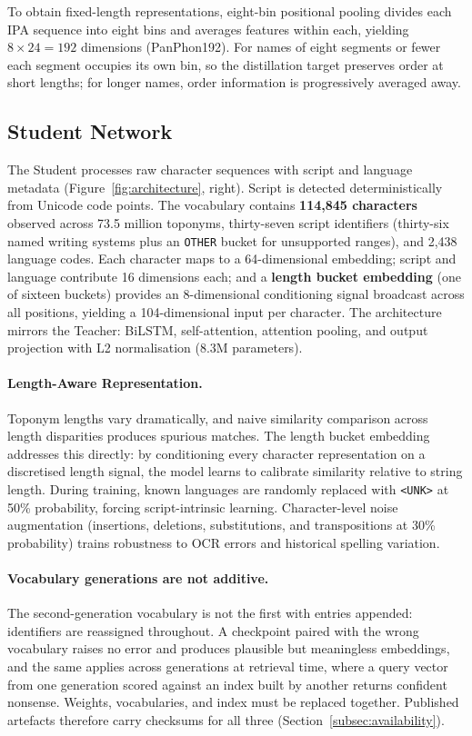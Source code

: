 \documentclass[11pt,a4paper]{article}
\begin{document}
To obtain fixed-length representations, eight-bin positional pooling divides each IPA sequence into eight bins and averages features within each, yielding $8 \times 24 = 192$ dimensions (PanPhon192). For names of eight segments or fewer each segment occupies its own bin, so the distillation target preserves order at short lengths; for longer names, order information is progressively averaged away.

\subsection{Student Network}
\label{subsec:student}

The Student processes raw character sequences with script and language metadata (Figure~\ref{fig:architecture}, right). Script is detected deterministically from Unicode code points. The vocabulary contains \textbf{114,845 characters} observed across 73.5 million toponyms, thirty-seven script identifiers (thirty-six named writing systems plus an \texttt{OTHER} bucket for unsupported ranges), and 2,438 language codes. Each character maps to a 64-dimensional embedding; script and language contribute 16 dimensions each; and a \textbf{length bucket embedding} (one of sixteen buckets) provides an 8-dimensional conditioning signal broadcast across all positions, yielding a 104-dimensional input per character. The architecture mirrors the Teacher: BiLSTM, self-attention, attention pooling, and output projection with L2 normalisation (8.3M parameters).

\paragraph{Length-Aware Representation.} Toponym lengths vary dramatically, and naive similarity comparison across length disparities produces spurious matches. The length bucket embedding addresses this directly: by conditioning every character representation on a discretised length signal, the model learns to calibrate similarity relative to string length. During training, known languages are randomly replaced with \texttt{<UNK>} at 50\% probability, forcing script-intrinsic learning. Character-level noise augmentation (insertions, deletions, substitutions, and transpositions at 30\% probability) trains robustness to OCR errors and historical spelling variation.

\paragraph{Vocabulary generations are not additive.} The second-generation vocabulary is not the first with entries appended: identifiers are reassigned throughout. A checkpoint paired with the wrong vocabulary raises no error and produces plausible but meaningless embeddings, and the same applies across generations at retrieval time, where a query vector from one generation scored against an index built by another returns confident nonsense. Weights, vocabularies, and index must be replaced together. Published artefacts therefore carry checksums for all three (Section~\ref{subsec:availability}).
\end{document}
